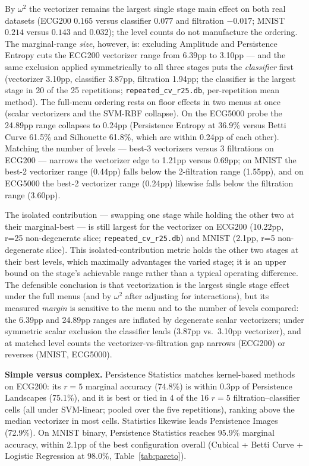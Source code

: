 \documentclass[12pt, a4paper]{report}
\theoremstyle{definition}
\theoremstyle{plain}
\theoremstyle{remark}
\begin{document}
By $\omega^2$ the
vectorizer remains the largest single stage main effect on both real
datasets (ECG200 $0.165$ versus classifier $0.077$ and filtration
$-0.017$; MNIST $0.214$ versus $0.143$ and $0.032$); the level counts
do not manufacture the ordering. The marginal-range \emph{size},
however, is: excluding Amplitude and Persistence Entropy cuts the
ECG200 vectorizer range from 6.39pp to 3.10pp --- and the same
exclusion applied symmetrically to all three stages puts the
\emph{classifier} first (vectorizer 3.10pp, classifier 3.87pp,
filtration 1.94pp; the classifier is the largest stage in 20 of the
25 repetitions; \texttt{repeated\_cv\_r25.db}, per-repetition mean
method). The full-menu ordering rests on floor effects in two menus
at once (scalar vectorizers and the SVM-RBF collapse). On the ECG5000
probe the 24.89pp range collapses to 0.24pp (Persistence Entropy at
36.9\% versus Betti Curve 61.5\% and Silhouette 61.8\%, which are
within 0.24pp of each other). Matching the number of levels ---
best-3 vectorizers versus 3 filtrations on ECG200 --- narrows the
vectorizer edge to 1.21pp versus 0.69pp; on MNIST the best-2
vectorizer range (0.44pp) falls below the 2-filtration range (1.55pp),
and on ECG5000 the best-2 vectorizer range (0.24pp) likewise falls
below the filtration range (3.60pp).

The isolated contribution ---
swapping one stage while holding the other two at their marginal-best
--- is still largest for the vectorizer on ECG200 (10.22pp, r{=}25
non-degenerate slice; \texttt{repeated\_cv\_r25.db}) and MNIST
(2.1pp, r{=}5 non-degenerate slice). This isolated-contribution metric holds the other two stages
at their best levels, which maximally advantages the varied stage; it
is an upper bound on the stage's achievable range rather than a
typical operating difference. The defensible conclusion is that vectorization is the largest
single stage effect under the full menus (and by $\omega^2$ after
adjusting for interactions), but its measured \emph{margin} is
sensitive to the menu and to the number of levels compared: the
6.39pp and 24.89pp ranges are inflated by degenerate scalar
vectorizers; under symmetric scalar exclusion the classifier leads
(3.87pp vs.\ 3.10pp vectorizer), and at matched level counts the
vectorizer-vs-filtration gap narrows (ECG200) or reverses (MNIST,
ECG5000).

\textbf{Simple versus complex.} Persistence Statistics matches
kernel-based methods on ECG200: its $r{=}5$ marginal accuracy (74.8\%) is
within 0.3pp of Persistence Landscapes (75.1\%), and it is best or
tied in 4 of the 16 $r{=}5$ filtration--classifier cells (all under
SVM-linear; pooled over the five repetitions), ranking above the
median vectorizer in most cells.
Statistics likewise leads Persistence Images (72.9\%). On MNIST
binary, Persistence Statistics reaches 95.9\% marginal accuracy,
within 2.1pp of the best configuration overall (Cubical + Betti
Curve + Logistic Regression at 98.0\%, Table~\ref{tab:pareto}).
\end{document}
